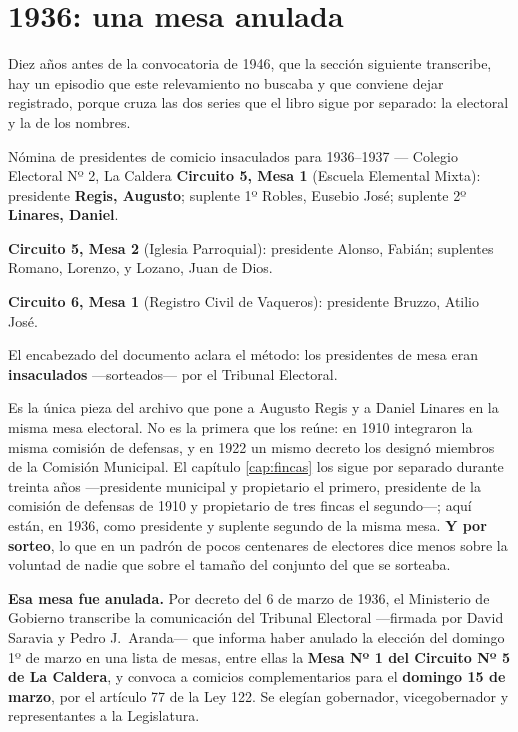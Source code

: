 \section{1936: una mesa anulada}

Diez años antes de la convocatoria de 1946, que la sección siguiente transcribe, hay un episodio que este relevamiento no buscaba y que
conviene dejar registrado, porque cruza las dos series que el libro sigue por separado: la
electoral y la de los nombres.

\begin{ficha}{Nómina de presidentes de comicio insaculados para 1936--1937 --- Colegio Electoral Nº 2, La Caldera}
\textbf{Circuito 5, Mesa 1} (Escuela Elemental Mixta): presidente \textbf{Regis,
Augusto}; suplente 1º Robles, Eusebio José; suplente 2º \textbf{Linares,
Daniel}.

\textbf{Circuito 5, Mesa 2} (Iglesia Parroquial): presidente Alonso, Fabián; suplentes Romano,
Lorenzo, y Lozano, Juan de Dios.

\textbf{Circuito 6, Mesa 1} (Registro Civil de Vaqueros): presidente Bruzzo, Atilio José.

El encabezado del documento aclara el método: los presidentes de mesa eran
\textbf{insaculados} ---sorteados--- por el Tribunal Electoral.
\end{ficha}

Es la única pieza del archivo que pone a Augusto Regis y a Daniel Linares en la misma mesa
electoral. No es la primera que los reúne: en 1910 integraron la misma comisión de defensas, y
en 1922 un mismo decreto los designó miembros de la Comisión Municipal. El capítulo \ref{cap:fincas} los sigue por separado durante treinta años
---presidente municipal y propietario el primero, presidente de la comisión de defensas de
1910 y propietario de tres fincas el segundo---; aquí están, en 1936, como presidente y
suplente segundo de la misma mesa. \textbf{Y por sorteo}, lo que en un padrón de pocos
centenares de electores dice menos sobre la voluntad de nadie que sobre el tamaño del conjunto
del que se sorteaba.

\textbf{Esa mesa fue anulada.} Por decreto del 6 de marzo de 1936, el Ministerio de Gobierno
transcribe la comunicación del Tribunal Electoral ---firmada por David Saravia y Pedro J.\
Aranda--- que informa haber anulado la elección del domingo 1º de marzo en una lista de mesas,
entre ellas la \textbf{Mesa Nº 1 del Circuito Nº 5 de La Caldera}, y convoca a comicios
complementarios para el \textbf{domingo 15 de marzo}, por el artículo 77 de la Ley 122. Se
elegían gobernador, vicegobernador y representantes a la Legislatura.

